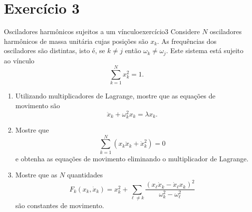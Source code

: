 \section*{Exercício 3}
\begin{exercício}{Osciladores harmônicos sujeitos a um vínculo}{exercício3}
    Considere \(N\) osciladores harmônicos de massa unitária cujas posições são \(x_k\). As frequências dos osciladores são distintas, isto é, se \(k \neq j\) então \(\omega_k \neq \omega_j\). Este sistema está sujeito ao vínculo
    \begin{equation*}
        \sum_{k=1}^N x_k^2 = 1.
    \end{equation*}
    \begin{enumerate}[label=(\alph*)]
        \item Utilizando multiplicadores de Lagrange, mostre que as equações de movimento são
            \begin{equation*}
                \ddot{x}_k + \omega_k^2x_k = \lambda x_k.
            \end{equation*}
        \item Mostre que
            \begin{equation*}
                \sum_{k = 1}^N \left(x_k \ddot{x}_k + \dot{x}_k^2\right) = 0
            \end{equation*}
            e obtenha as equações de movimento eliminando o multiplicador de Lagrange.
        \item Mostre que as \(N\) quantidades
            \begin{equation*}
                F_k(x_k,\dot{x}_k) = x_k^2 + \sum_{\ell\neq k}\frac{\left(x_\ell \dot{x}_k - \dot{x}_\ell x_k\right)^2}{\omega_k^2 - \omega_\ell^2}
            \end{equation*}
            são constantes de movimento.
    \end{enumerate}
\end{exercício}
